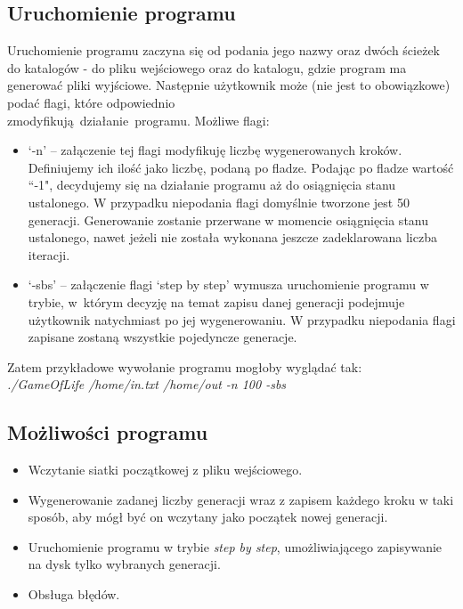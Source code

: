 \documentclass{article}
\begin{document}
\subsection{Uruchomienie programu}
Uruchomienie programu zaczyna się od podania jego nazwy oraz dwóch ścieżek
do katalogów - do pliku wejściowego oraz do katalogu, gdzie program ma
generować pliki wyjściowe. Następnie użytkownik może (nie jest to
obowiązkowe) podać flagi, które odpowiednio\\ zmodyfikują~działanie~programu.
Możliwe flagi:
\begin{itemize}
  \item `-n’ -- załączenie tej flagi modyfikuję liczbę wygenerowanych
    kroków. Definiujemy ich ilość jako liczbę, podaną po fladze.
    Podając po fladze wartość ``-1", decydujemy się na działanie programu aż do
    osiągnięcia stanu ustalonego. W przypadku niepodania flagi domyślnie
    tworzone jest 50 generacji. Generowanie zostanie przerwane w momencie osiągnięcia
    stanu ustalonego, nawet jeżeli nie została wykonana jeszcze zadeklarowana
    liczba iteracji.
  \item `-sbs’ -- załączenie flagi ‘step by step’ wymusza uruchomienie
    programu w trybie, w~którym decyzję na temat zapisu danej generacji
    podejmuje użytkownik natychmiast po jej wygenerowaniu. W przypadku niepodania
    flagi zapisane zostaną wszystkie pojedyncze generacje.
\end{itemize}

Zatem przykładowe wywołanie programu mogłoby wyglądać tak:\\
\textit{./GameOfLife /home/in.txt /home/out -n 100 -sbs}

\newpage
\subsection{Możliwości programu}
\begin{itemize}
  \item Wczytanie siatki początkowej z pliku wejściowego.
  \item Wygenerowanie zadanej liczby generacji wraz z zapisem każdego
    kroku w taki sposób, aby mógł być on wczytany jako początek nowej
    generacji.
  \item Uruchomienie programu w trybie \textit{step by step},
    umożliwiającego zapisywanie na dysk tylko wybranych generacji.
  \item Obsługa błędów.
\end{itemize}
\end{document}
